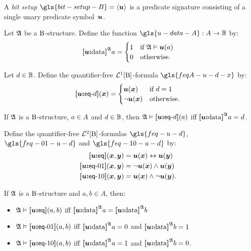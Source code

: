 A \emph{bit setup} $\gls{bit-setup-B} = \seq{\su}$ is a predicate signature
consisting of a single unary predicate symbol~$\su$.

\begin{definition}
Let $\StrA$ be a $\BS$-structure.
Define the function $\gls{u-data-A} : \domA \to \Bits$ by:
\[
  \data\su\StrA a = \begin{cases}
    1 &\text{if } \StrA \vDash \su(a) \\
    0 &\text{otherwise.}
  \end{cases}
\]
\end{definition}
\begin{definition}
Let $\datad \in \Bits$. Define the quantifier-free $\vFoF1\BS$-formula
$\gls{feqA-u-d-x}$ by:
\[
  \feqA\su\datad(\xx) = \begin{cases}
    \su(\xx) &\text{if } \datad = 1 \\
    \lnot\su(\xx) &\text{otherwise.}
  \end{cases}
\]
\end{definition}
If $\StrA$ is a $\BS$-structure, $\ea \in \domA$ and $\datad \in \Bits$,
then $\StrA \vDash \feqA\su\datad(\ea)$ iff $\data\su\StrA\ea = \datad$.

\begin{definition}
Define the quantifier-free $\vFoF2\BS$-formulas 
$\gls{feq-u-d}$, $\gls{feq-01-u-d}$ and $\gls{feq-10-u-d}$ by:
\begin{align*}
  \feq\su(\xx,\yy) &= \su(\xx) \lequ \su(\yy) \\
  \feqOI\su(\xx,\yy) &= \lnot \su(\xx) \land \su(\yy) \\
  \feqIO\su(\xx,\yy) &= \su(\xx) \land \lnot \su(\yy). \\
\end{align*}
\end{definition}
If $\StrA$ is a $\BS$-structure and $a, b \in A$, then:
\begin{itemize}
  \item $\StrA \vDash \feq\su(a, b)$ iff $\data\su\StrA a = \data\su\StrA b$
  \item $\StrA \vDash \feqOI\su(a, b)$ iff $\data\su\StrA a = 0$ and
  $\data\su\StrA b = 1$
  \item $\StrA \vDash \feqIO\su(a, b)$ iff $\data\su\StrA a = 1$ and
  $\data\su\StrA b = 0$.
\end{itemize}